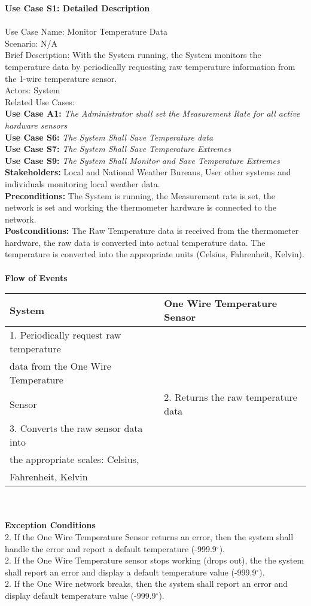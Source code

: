 \documentclass[letterpaper]{article}
\begin{document}
\noindent
\textbf{Use Case S1:  Detailed Description}\\\\
Use Case Name:  Monitor Temperature Data\\
Scenario: N/A\\
Brief Description:  With the System running, the System monitors the
temperature data by periodically requesting raw temperature
information from the 1-wire temperature sensor.\\
Actors:  System\\
Related Use Cases:\\
\textbf{Use Case A1:} \emph{The Administrator shall set the
Measurement Rate for all active hardware sensors}\\
\textbf{Use Case S6: }\emph{The System Shall Save Temperature
data}\\
\textbf{Use Case S7: }\emph{The System Shall Save Temperature
Extremes}\\
\textbf{Use Case S9: }\emph{The System Shall Monitor and Save
Temperature Extremes}\\
\textbf{Stakeholders:  } Local and National Weather Bureaus, User
other systems and individuals monitoring local weather data.\\
\textbf{Preconditions:  } The System is running, the Measurement
rate is set, the network is set and working the thermometer hardware
is connected to the network.\\
\textbf{Postconditions:  } The Raw Temperature data is received from
the thermometer hardware, the raw data is converted into actual
temperature data.  The temperature is converted into the appropriate
units (Celsius, Fahrenheit, Kelvin).\\\\
\textbf{Flow of Events}\\
\begin{tabular}{|l|l|}\hline
\textbf{System} & \textbf{One Wire Temperature Sensor}\\\hline
1. Periodically request raw temperature  & \\
data from the One Wire Temperature & \\
Sensor &
2. Returns the raw temperature data\\\hline
3. Converts the raw sensor data into & \\the appropriate scales:
Celsius, & \\Fahrenheit, Kelvin & 
 \\\hline
\end{tabular}\\\\
\textbf{Exception Conditions}\\
2.  If the One Wire Temperature Sensor returns an error, then
the system shall handle the error and report a default
temperature (-999.9$^\circ$).\\
2.  If the One Wire Temperature sensor stops working (drops out),
the the system shall report an error and display a default
temperature value (-999.9$^\circ$).\\
2.  If the One Wire network breaks, then the system shall report an
error and display default temperature value (-999.9$^\circ$).
\end{document}
